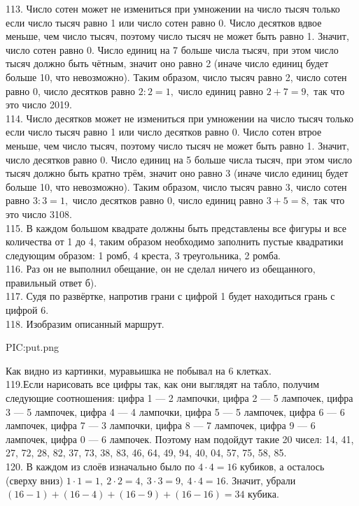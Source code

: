 113. Число сотен может не измениться при умножении на число тысяч только если число тысяч равно 1 или число сотен равно 0. Число десятков вдвое меньше, чем число тысяч, поэтому число тысяч не может быть равно 1. Значит, число сотен равно 0. Число единиц на 7 больше числа тысяч, при этом число тысяч должно быть чётным, значит оно равно 2 (иначе число единиц будет больше 10, что невозможно). Таким образом, число тысяч равно 2, число сотен равно 0, число десятков равно $2:2=1,$ число единиц равно $2+7=9,$ так что это число 2019.\\
114. Число десятков может не измениться при умножении на число тысяч только если число тысяч равно 1 или число десятков равно 0. Число сотен втрое меньше, чем число тысяч, поэтому число тысяч не может быть равно 1. Значит, число десятков равно 0. Число единиц на 5 больше числа тысяч, при этом число тысяч должно быть кратно трём, значит оно равно 3 (иначе число единиц будет больше 10, что невозможно). Таким образом, число тысяч равно 3, число сотен равно $3:3=1,$ число десятков равно 0, число единиц равно $3+5=8,$ так что это число 3108.\\
115. В каждом большом квадрате должны быть представлены все фигуры и все количества от 1 до 4, таким образом необходимо заполнить пустые квадратики следующим образом: 1 ромб, 4 креста, 3 треугольника, 2 ромба.\\
116. Раз он не выполнил обещание, он не сделал ничего из обещанного, правильный ответ б).\\
117. Судя по развёртке, напротив грани с цифрой 1 будет находиться грань с цифрой 6.\\
118. Изобразим описанный маршрут.
\begin{center}
{{PIC:put.png}}
\end{center}
Как видно из картинки, муравьишка не побывал на 6 клетках.\\
119.Если нарисовать все цифры так, как они выглядят на табло, получим следующие соотношения: цифра 1 --- 2 лампочки, цифра 2 --- 5 лампочек, цифра 3 --- 5 лампочек, цифра 4 --- 4 лампочки, цифра 5 --- 5 лампочек, цифра 6 --- 6 лампочек, цифра 7 --- 3 лампочки, цифра 8 --- 7 лампочек, цифра 9 --- 6 лампочек, цифра 0 --- 6 лампочек. Поэтому нам подойдут такие 20 чисел: 14, 41, 27, 72, 28, 82, 37, 73, 38, 83, 46, 64, 49, 94, 40, 04, 57, 75, 58, 85.\\
120. В каждом из слоёв изначально было по $4\cdot4=16$ кубиков, а осталось (сверху вниз) $1\cdot1=1,\ 2\cdot2=4,\ 3\cdot3=9,\ 4\cdot4=16.$ Значит, убрали $(16-1)+(16-4)+(16-9)+(16-16)=34$ кубика.\\
